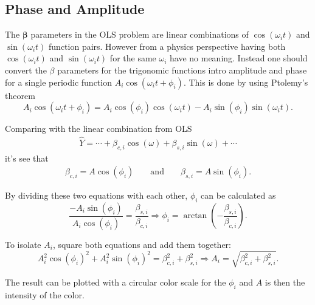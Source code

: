 \subsection{Phase and Amplitude}

The $\mathbf{\beta}$ parameters in the OLS problem are linear combinations of $\cos(\omega_i t)$ and $\sin(\omega_i t)$ function pairs.
However from a physics perspective having both $\cos(\omega_i t)$ and $\sin(\omega_i t)$ for the same $\omega_i$ have no meaning.
Instead one should convert the $\beta$ parameters for the trigonomic functions intro amplitude and phase for a single periodic function $A_i \cos(\omega_i t + \phi_i)$.
This is done by using Ptolemy's theorem
\begin{equation}
A_i \cos(\omega_i t + \phi_i) = A_i \cos(\phi_i) \cos(\omega_i t) - A_i \sin(\phi_i) \sin(\omega_i t).
\end{equation}

Comparing with the linear combination from OLS
\begin{align}
\hat{Y} = \cdots + \beta_{c,i} \cos(\omega) + \beta_{s,i} \sin(\omega) + \cdots
\end{align}
it's see that
\begin{align}
\beta_{c,i} = A \cos(\phi_i) && \text{ and } && \beta_{s,i} = A \sin(\phi_i).
\end{align}

By dividing these two equations with each other, $\phi_i$ can be calculated as  
\begin{equation}
\frac{- A_i \sin(\phi_i)}{A_i \cos(\phi_i)} = \frac{\beta_{s,i}}{\beta_{c,i}} \Rightarrow \phi_i = \arctan\left(-\frac{\beta_{s,i}}{\beta_{c,i}}\right).
\end{equation}

To isolate $A_i$, square both equations and add them together:
\begin{equation}
A_i^2 \cos(\phi_i)^2 + A_i^2 \sin(\phi_i)^2 = \beta_{c,i}^2 + \beta_{s,i}^2 \Rightarrow A_i = \sqrt{\beta_{c,i}^2 + \beta_{s,i}^2}.
\end{equation}

The result can be plotted with a circular color scale for the $\phi_i$ and $A$ is then the intensity of the color.
